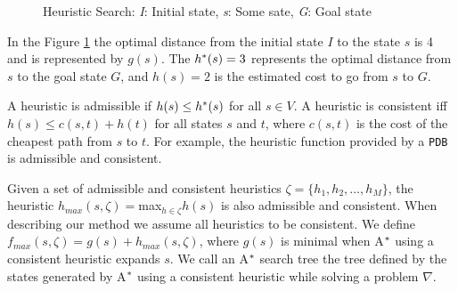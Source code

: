 \begin{figure}[htb]
\centering
{}
\caption{Heuristic Search: \textit{I}: Initial state, \textit{s}: Some sate, \textit{G}: Goal state} \label{fig:searchSpace}
\end{figure}

In the Figure \ref{fig:searchSpace} the optimal distance from the initial state $I$ to  the state $s$ is 4 and is represented by $g(s)$. The $h\sp{*}(s) = 3$ represents the optimal distance from $s$ to the goal state $G$, and $h(s) = 2$ is the estimated cost to go from $s$ to $G$.

A heuristic is admissible if $h(s) \leq h\sp{*}(s)$ for all $s \in V$. %
A heuristic is consistent iff $h(s) \leq c(s,t) + h(t)$ for all states $s$ and $t$, where $c(s,t)$ is the cost of the cheapest path from $s$ to $t$. For example, the heuristic function provided by a \texttt{PDB} \cite{culberson1998pattern} is admissible and consistent.

Given a set of admissible and consistent heuristics $\zeta = \{h_{1}, h_{2}, \dots, h_{M}\}$, the heuristic $h_{max}(s,\zeta) = $max$_{h \in \zeta} h(s)$ is also admissible and consistent. When describing our method we assume all heuristics to be consistent. We define $f_{max}(s, \zeta) = g(s) + h_{max}(s, \zeta)$, where $g(s)$ is minimal when A$\sp{*}$ using a consistent heuristic expands $s$. We call an A$\sp{*}$ search tree the tree defined by the states generated by A$\sp{*}$ using a consistent heuristic while solving a problem $\nabla$.

